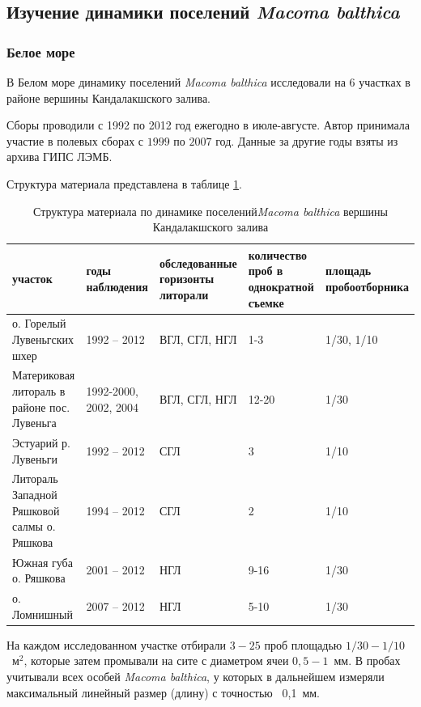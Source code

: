 	\subsection{Изучение динамики поселений {\it Macoma balthica}}
        \subsubsection{Белое море}
В Белом море динамику поселений {\it Macoma balthica} исследовали на $6$ участках в районе вершины Кандалакшского залива. 

Сборы проводили с 1992 по 2012 год ежегодно в июле-августе.
Автор принимала участие в полевых сборах с $1999$ по $2007$ год.
Данные за другие годы взяты из архива ГИПС ЛЭМБ.

Структура материала представлена в таблице \ref{tab:material_Kandalaksha}.
\begin{table}
    \begin{tabularx}{\textwidth}{|*{5}{X|}} \hline
участок & годы наблюдения & обследованные горизонты литорали & количество проб в однократной съемке & площадь пробоотборника  \\ \hline
о. Горелый Лувеньгских шхер & 1992 -- 2012 & ВГЛ, СГЛ, НГЛ & 1-3 & 1/30, 1/10 \\ \hline
Материковая литораль в районе пос. Лувеньга & 1992-2000, 2002, 2004 & ВГЛ, СГЛ, НГЛ & 12-20 & 1/30 \\ \hline
Эстуарий р. Лувеньги & 1992 -- 2012 & СГЛ & 3 & 1/10 \\ \hline
Литораль Западной Ряшковой салмы о. Ряшкова & 1994 -- 2012 & СГЛ & 2 & 1/10 \\ \hline
Южная губа о. Ряшкова & 2001 -- 2012 & НГЛ & 9-16 & 1/30 \\ \hline
о. Ломнишный & 2007 -- 2012 & НГЛ & 5-10 & 1/30  \\ \hline
\end{tabularx}
\caption{Структура материала по динамике поселений{\it Macoma balthica} вершины Кандалакшского залива}
\label{tab:material_Kandalaksha}
\end{table}

На каждом исследованном участке отбирали $3 - 25$ проб площадью $1/30 - 1/10$~м$^2$, которые затем промывали на сите с диаметром ячеи $0,5 - 1$~мм. 
В пробах учитывали всех особей {\it Macoma balthica}, у которых в дальнейшем измеряли максимальный линейный размер (длину) с точностью ~0,1~мм. 

